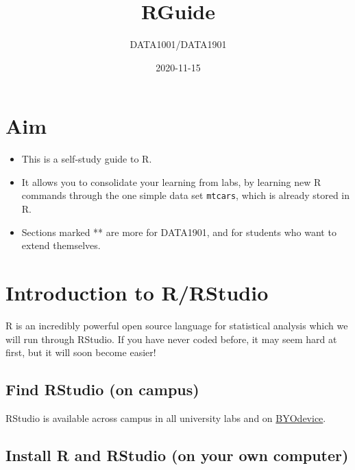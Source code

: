 \documentclass[]{article}
\title{RGuide}
\author{DATA1001/DATA1901}
\date{2020-11-15}
\providecommand{\tightlist}{%
  \setlength{\itemsep}{0pt}\setlength{\parskip}{0pt}}
\begin{document}
\maketitle

{
\setcounter{tocdepth}{2}
\tableofcontents
}
\hypertarget{aim}{%
\section*{Aim}\label{aim}}

\begin{itemize}
\tightlist
\item
  This is a self-study guide to R.
\item
  It allows you to consolidate your learning from labs, by learning new R commands through the one simple data set \texttt{mtcars}, which is already stored in R.
\item
  Sections marked ** are more for DATA1901, and for students who want to extend themselves.
\end{itemize}

\hypertarget{intro}{%
\section{Introduction to R/RStudio}\label{intro}}

R is an incredibly powerful open source language for statistical analysis which we will run through RStudio. If you have never coded before, it may seem hard at first, but it will soon become easier!

\hypertarget{find-rstudio-on-campus}{%
\subsection{Find RStudio (on campus)}\label{find-rstudio-on-campus}}

RStudio is available across campus in all university labs and on \href{https://byod.sydney.edu.au}{BYOdevice}.

\hypertarget{install-r-and-rstudio-on-your-own-computer}{%
\subsection{Install R and RStudio (on your own computer)}\label{install-r-and-rstudio-on-your-own-computer}}
\end{document}
